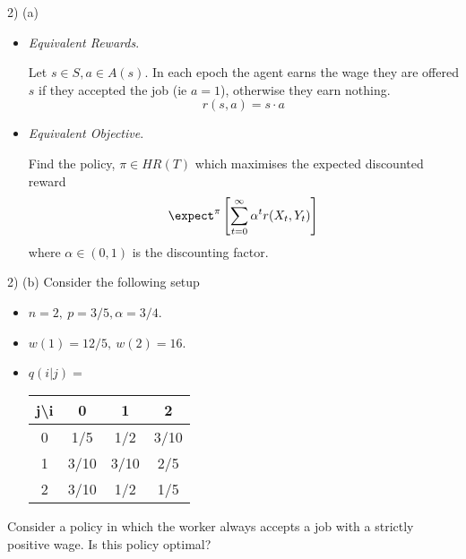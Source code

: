 \documentclass[11pt,a4paper]{article}
\begin{document}
\begin{answer}{2) (a)}
\begin{itemize}
    \item \textit{Equivalent Rewards}.
    \par Let $s\in S,a\in A(s)$. In each epoch the agent earns the wage they are offered $s$ if they accepted the job (ie $a=1$), otherwise they earn nothing.
    \[ r(s,a)=s\cdot a \]

    \item \textit{Equivalent Objective}.
    \par Find the policy, $\pi\in HR(T)$ which maximises the expected discounted reward
    \[ \expect^\pi\left[\sum_{t=0}^\infty\alpha^t r(X_t,Y_t)\right] \]
    where $\alpha\in(0,1)$ is the discounting factor.
  \end{itemize}
\end{answer}

\begin{question}{2) (b)}
  Consider the following setup
  \begin{itemize}
    \item $n=2,\ p=3/5, \alpha=3/4$.
    \item $w(1)=12/5,\ w(2)=16$.
    \item $q(i|j)=$\begin{tabular}{c|ccc}
        j\textbackslash i&0&1&2\\\hline
        0&1/5&1/2&3/10\\
        1&3/10&3/10&2/5\\
        2&3/10&1/2&1/5
      \end{tabular}
  \end{itemize}
  Consider a policy in which the worker always accepts a job with a strictly positive wage. Is this policy optimal?
\end{question}
\end{document}
